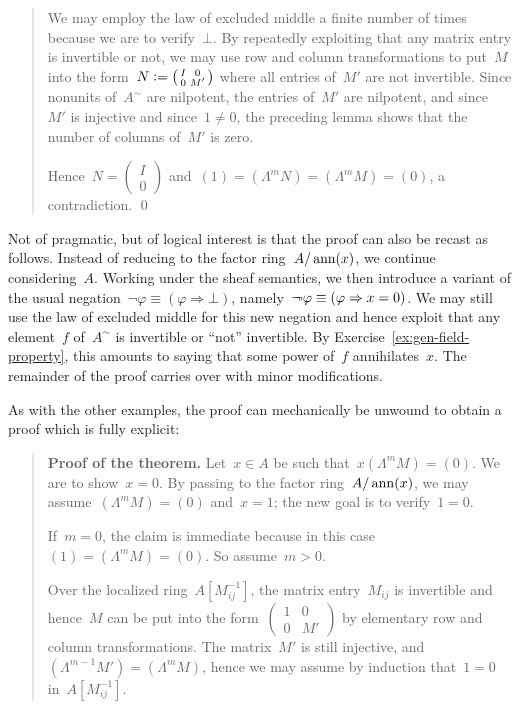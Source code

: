 \documentclass{ws-rv9x6}
\begin{document}
{\begin{quote}
We may employ the law of excluded middle a finite number of times because we
are to verify~$\bot$. By repeatedly exploiting that any matrix entry is
invertible or not, we may use row and column transformations to put~$M$ into
the form~$N \vcentcolon= \left(\begin{smallmatrix}I&0\\0&M'\end{smallmatrix}\right)$ where all
entries of~$M'$ are not invertible. Since nonunits of~$A^\sim$ are nilpotent, the entries of~$M'$ are
nilpotent, and since~$M'$ is injective and since~$1 \neq 0$, the preceding lemma
shows that the number of columns of~$M'$ is zero.

Hence~$N = \left(\begin{smallmatrix}I\\0\end{smallmatrix}\right)$ and~$(1) =
(\Lambda^m N) = (\Lambda^m M) = (0)$, a contradiction. \qed
\end{quote}

\begin{remark}Not of pragmatic, but of logical interest is that the proof can
also be recast as follows. Instead of reducing to the factor ring~$A/\operatorname{ann}(x)$,
we continue considering~$A$. Working under the sheaf semantics, we then
introduce a variant of the usual negation~$\neg\varphi \equiv (\varphi
\Rightarrow \bot)$, namely~$\neg\!\!\!\neg\varphi \equiv (\varphi \Rightarrow x = 0)$.
We may still use the law of excluded middle for this new negation and hence
exploit that any element~$f$ of~$A^\sim$ is invertible or ``not'' invertible. By
Exercise~\ref{ex:gen-field-property}, this amounts to saying that some power
of~$f$ annihilates~$x$. The remainder of the proof carries over with minor
modifications.
\end{remark}

As with the other examples, the proof can mechanically be unwound to obtain a proof
which is fully explicit:

\begin{quote}
\textbf{Proof of the theorem.} Let~$x \in A$ be such that~$x (\Lambda^m M) = (0)$. We are to
show~$x = 0$. By passing to the factor ring~$A/\operatorname{ann}(x)$, we may
assume~$(\Lambda^m M) = (0)$ and~$x = 1$; the new goal is to verify~$1 = 0$.

If~$m = 0$, the claim is immediate because in this case~$(1) = (\Lambda^m M) =
(0)$. So assume~$m > 0$.

Over the localized ring~$A[M_{ij}^{-1}]$, the matrix entry~$M_{ij}$ is
invertible and hence~$M$ can be put into the
form~$\left(\begin{smallmatrix}1&0\\0&M'\end{smallmatrix}\right)$ by elementary
row and column transformations. The matrix~$M'$ is still injective,
and~$(\Lambda^{m-1} M') = (\Lambda^m M)$, hence we may assume by induction
that~$1 = 0$ in~$A[M_{ij}^{-1}]$.


\end{quote}}
\end{document}
